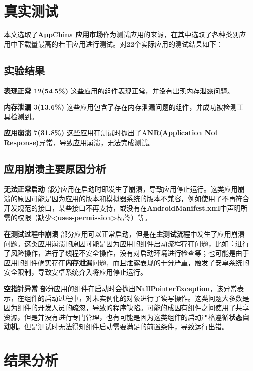 \section{真实测试}


本文选取了\textbf{AppChina 应用市场}\cite{appchina}作为测试应用的来源，在其中选取了各种类别应用中下载量最高的若干应用进行测试。对\textbf{22}个实际应用的测试结果如下：

\subsection{实验结果}\label{now-result}
\textbf{表现正常 12(54.5\%) }这些应用的组件表现正常，并没有出现内存泄露问题。

\textbf{内存泄漏 3(13.6\%) }这些应用包含了存在内存泄漏问题的组件，并成功被检测工具检测到。

\textbf{应用崩溃 7(31.8\%) }这些应用在测试时抛出了\textbf{ANR(Application Not Response)}异常，导致应用崩溃，无法完成测试。

\subsection{应用崩溃主要原因分析}

\textbf{无法正常启动 } 部分应用在启动时即发生了崩溃，导致应用停止运行。这类应用崩溃的原因可能是因为应用的版本和模拟器系统的版本不兼容，例如使用了不再符合开发规范的接口，某些接口不再支持，或没有在\textbf{AndroidManifest.xml}中声明所需的权限（缺少\textbf{<uses-permission>}标签）等。

\textbf{在测试过程中崩溃 } 部分应用可以正常启动，但是在\textbf{主测试流程}中发生了应用崩溃问题。这类应用崩溃的原因可能是因为应用的组件启动流程存在问题，比如：进行了风险操作，进行了线程不安全操作，没有对启动环境进行检查等；也可能是由于应用的组件确实存在\textbf{内存泄漏}问题，而且泄露表现的十分严重，触发了安卓系统的安全限制，导致安卓系统介入将应用停止运行。

\textbf{空指针异常 } 部分应用的组件在启动时会抛出\textbf{NullPointerException}，该异常表示，在组件的启动过程中，对未实例化的对象进行了读写操作。这类问题大多数是因为组件的开发人员的疏忽，导致的程序缺陷。可能的成因有组件之间使用了共享资源，但是并没有进行专门管理，也有可能是因为这类组件的启动严格遵循\textbf{状态自动机}，但是测试时无法得知组件启动需要满足的前置条件，导致运行出错。

\section{结果分析}

